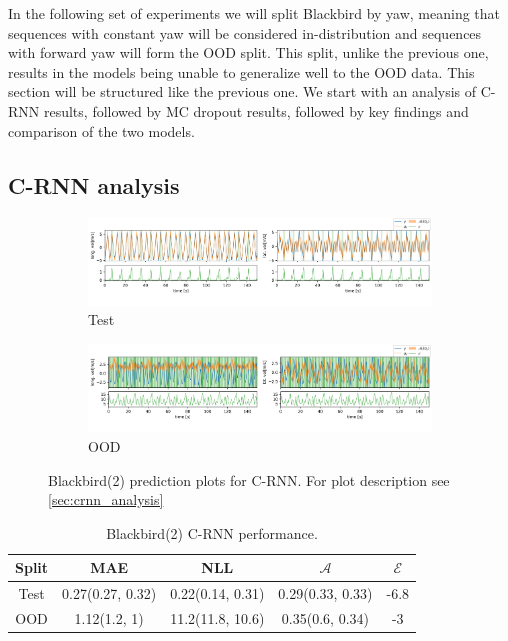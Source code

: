 
In the following set of experiments we will split Blackbird by yaw, meaning that sequences with constant yaw will be considered in-distribution and sequences with forward yaw will form the OOD split. This split, unlike the previous one, results in the models being unable to generalize well to the OOD data. This section will be structured like the previous one. We start with an analysis of C-RNN results, followed by MC dropout results, followed by key findings and comparison of the two models.

\subsection{C-RNN analysis}

\begin{figure}[h]
  \centering
  
  \begin{subfigure}[b]{\textwidth}
    \includegraphics[width=\textwidth]{Experiments/figs/bb2_test.png}
    \caption{Test}
  \end{subfigure}
  
  \begin{subfigure}[b]{\textwidth}
    \includegraphics[width=\textwidth]{Experiments/figs/bb2_ood.png}
    \caption{OOD}
  \end{subfigure}
  
  \caption[Blackbird(2) prediction plots for C-RNN]{Blackbird(2) prediction plots for C-RNN. For plot description see \cref{sec:crnn_analysis}}
  \label{fig:bb2_run}
\end{figure}

\begin{table}[h]
\centering
    \begin{tabular}{c  c  c   c  c }  
        \toprule
        Split & MAE & NLL & $\mathcal{A}$ & $\mathcal{E}$\\
        \midrule
        Test & 0.27(0.27, 0.32) & 0.22(0.14, 0.31) & 0.29(0.33, 0.33) &  -6.8\\
        OOD  &  1.12(1.2, 1) &  11.2(11.8, 10.6) & 0.35(0.6, 0.34)&  -3\\
        \midrule
    \end{tabular}
    \caption[Blackbird(2) C-RNN performance]{Blackbird(2) C-RNN performance.}
    \label{tbl:bb2_CRNN}
\end{table}


